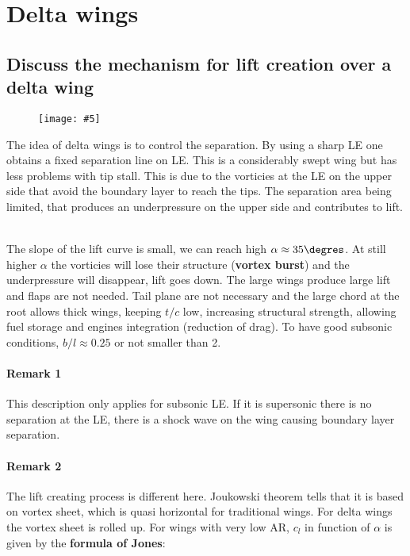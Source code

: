\documentclass[british,french,11pt, a4paper, openany]{article}
\newcommand{\wrapfig}[6]{%
	\begin{wrapfigure}[#1]{#2}{#3cm}%
		\vspace{-5mm}%
		\texttt{[image: \#5]}%
		\captionof{figure}{}%
		\label{#6}%
	\end{wrapfigure}%
}
\begin{document}

\section{Delta wings}
\subsection{Discuss the mechanism for lift creation over a delta wing}
\wrapfig{9}{l}{5}{0.15}{ch7/21}{ch7/21}
The idea of delta wings is to control the separation. By using a sharp LE one obtains a fixed separation line on LE. This is a considerably swept wing but has less problems with tip stall. This is due to the vorticies at the LE on the upper side that avoid the boundary layer to reach the tips. The separation area being limited, that produces an underpressure on the upper side and contributes to lift. 

\ \\
The slope of the lift curve is small, we can reach high $\alpha \approx 35\degres$. At still higher $\alpha$ the vorticies will lose their structure (\textbf{vortex burst}) and the underpressure will disappear, lift goes down. The large wings produce large lift and flaps are not needed. Tail plane are not necessary and the large chord at the root allows thick wings, keeping $t/c$ low, increasing structural strength, allowing fuel storage and engines integration (reduction of drag). To have good subsonic conditions, $b/l \approx 0.25$ or not smaller than 2.

\paragraph{Remark 1}
This description only applies for subsonic LE. If it is supersonic there is no separation at the LE, there is a shock wave on the wing causing boundary layer separation.  

\paragraph{Remark 2}
The lift creating process is different here. Joukowski theorem tells that it is based on vortex sheet, which is quasi horizontal for traditional wings. For delta wings the vortex sheet is rolled up. For wings with very low AR, $c_l$ in function of $\alpha$ is given by the \textbf{formula of Jones}:
\end{document}
